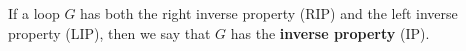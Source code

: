 If a loop $G$ has both the right inverse property (RIP) and the left inverse property (LIP), then we say that $G$ has the \textbf{inverse property} (IP).
